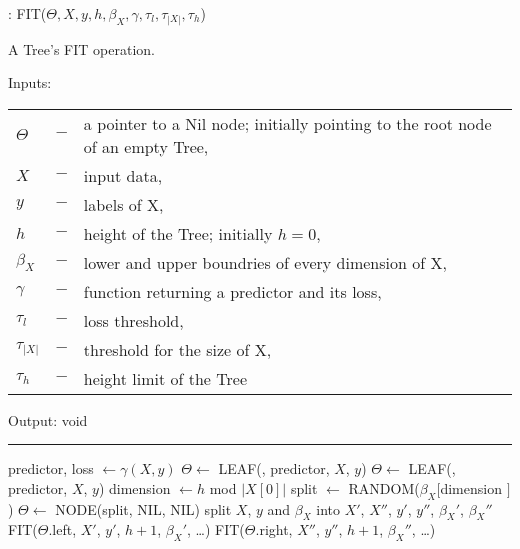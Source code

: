 \begin{algorithm}
  \caption{: FIT($\Theta, X, y, h, \beta_X, \gamma,
    \tau_{l}, \tau_{|X|}, \tau_{h}$)}%
  \label{alg:fit}
  A Tree's FIT operation.

  Inputs:

    \begin{tabu}{llX}
    $\Theta$ &$-$ &a pointer to a Nil node; initially
      pointing to the root node of an empty Tree,\\
    $X$ &$-$ &input data,\\
    $y$ &$-$ &labels of X,\\
    $h$ &$-$ &height of the Tree; initially $h = 0$,\\
    $\beta_X$ &$-$ &lower and upper boundries of every
      dimension of X,\\
    $\gamma$ &$-$ &function returning a predictor and its
      loss,\\
    $\tau_{l}$ &$-$ &loss threshold,\\
    $\tau_{|X|}$ &$-$ &threshold for the size of X,\\
    $\tau_{h}$ &$-$ &height limit of the Tree
    \end{tabu}

  Output: void

  \noindent\rule{\linewidth}{0.4pt}

  \begin{algorithmic}[1]
    \STATE predictor, loss $\leftarrow \gamma(X, y)$
      \STATE $\Theta \leftarrow$ LEAF(\TRUE, predictor,
         $X$, $y$)
      \STATE $\Theta \leftarrow$ LEAF(\FALSE, predictor,
        $X$, $y$)
    \ELSE
      \STATE dimension $\leftarrow h$ mod $|X[0]|$
      \STATE split $\leftarrow$ RANDOM($\beta_X[$dimension
        $]$)
      \STATE $\Theta \leftarrow$ NODE(split, NIL, NIL)
      \STATE split $X$, $y$ and $\beta_X$ into
        $X'$, $X''$, $y'$, $y''$, $\beta_X'$, $\beta_X''$
      \STATE FIT($\Theta$.left, $X'$, $y'$, $h + 1$,
        $\beta_X'$, \dots)
      \STATE FIT($\Theta$.right, $X''$, $y''$, $h + 1$,
        $\beta_X''$, \dots)
    \ENDIF
  \end{algorithmic}
\end{algorithm}

